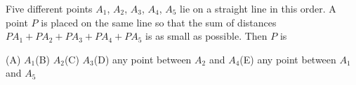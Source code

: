 Five different points $A_1$, $A_2$, $A_3$, $A_4$, $A_5$ lie on a straight line in this order. A point $P$ is placed on the same line so that the sum of distances $PA_1+PA_2+PA_3+PA_4+PA_5$ is as small as possible. Then $P$ is

(A) $A_1$\quad (B) $A_2$\quad (C) $A_3$\quad (D) any point between $A_2$ and $A_4$\quad (E) any point between $A_1$ and $A_5$
